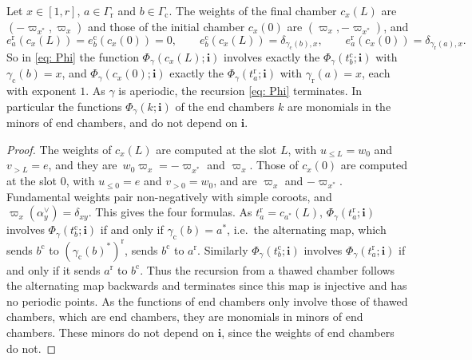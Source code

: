 \documentclass[a4paper]{amsart}
\numberwithin{equation}{section}
\theoremstyle{definition}
\theoremstyle{remark}
\newcommand{\bfi}{\mathbf{i}}
\newcommand{\rr}{\mathrm{r}}
\newcommand{\cc}{\mathrm{c}}
\begin{document}
\begin{lemma}
  \label{lem: tails}
  Let $x\in[1,r]$, $a\in\Gamma_{\rr}$ and $b\in\Gamma_{\cc}$.
  The weights of the final chamber $c_x(L)$ are $(-\varpi_{x^*},\varpi_x)$ and those of the initial chamber $c_x(0)$ are $(\varpi_x,-\varpi_{x^*})$, and
  \[
    e^\rr_a(c_x(L))=e^\cc_b(c_x(0))=0,
    \qquad
    e^\cc_b(c_x(L))=\delta_{\gamma_{\cc}(b),x},
    \qquad
    e^\rr_a(c_x(0))=\delta_{\gamma_{\rr}(a),x}.
  \]
  So in \eqref{eq: Phi} the function $\Phi_\gamma(c_x(L);\bfi)$ involves exactly the $\Phi_\gamma(t^\cc_b;\bfi)$ with $\gamma_{\cc}(b)=x$, and $\Phi_\gamma(c_x(0);\bfi)$ exactly the $\Phi_\gamma(t^\rr_a;\bfi)$ with $\gamma_{\rr}(a)=x$, each with exponent $1$.
  As $\gamma$ is aperiodic, the recursion \eqref{eq: Phi} terminates.
  In particular the functions $\Phi_\gamma(k;\bfi)$ of the end chambers $k$ are monomials in the minors of end chambers, and do not depend on $\bfi$.
\end{lemma}
\begin{proof}

  The weights of $c_x(L)$ are computed at the slot $L$, with $u_{\le L}=w_0$ and $v_{>L}=e$, and they are~$w_0\varpi_x=-\varpi_{x^*}$ and $\varpi_x$.
  Those of $c_x(0)$ are computed at the slot $0$, with $u_{\le0}=e$ and $v_{>0}=w_0$, and are $\varpi_x$ and $-\varpi_{x^*}$.
  Fundamental weights pair non-negatively with simple coroots, and $\varpi_x(\alpha^\vee_y)=\delta_{xy}$.
  This gives the four formulas.
  As $t^\rr_a=c_{a^*}(L)$, $\Phi_\gamma(t^\rr_a;\bfi)$ involves $\Phi_\gamma(t^\cc_b;\bfi)$ if and only if $\gamma_{\cc}(b)=a^*$, i.e.\ the alternating map, which sends $b^\cc$ to $(\gamma_{\cc}(b)^*)^\rr$, sends $b^\cc$ to $a^\rr$.
  Similarly $\Phi_\gamma(t^\cc_b;\bfi)$ involves $\Phi_\gamma(t^\rr_a;\bfi)$ if and only if it sends $a^\rr$ to $b^\cc$.
  Thus the recursion from a thawed chamber follows the alternating map backwards and terminates since this map is injective and has no periodic points.
  As the functions of end chambers only involve those of thawed chambers, which are end chambers, they are monomials in minors of end chambers.
  These minors do not depend on $\bfi$, since the weights of end chambers do not.
\end{proof}
\end{document}
